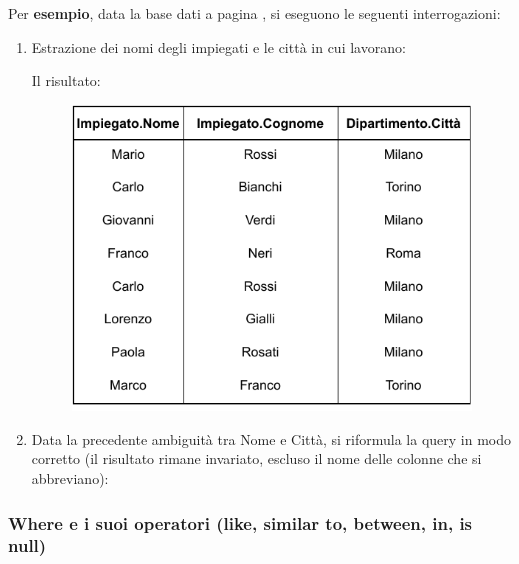 \documentclass[a4paper]{article}
\begin{document}
	\noindent
	Per \textcolor{Green4}{\textbf{esempio}}, data la base dati a pagina \pageref{select dbms}, si eseguono le seguenti interrogazioni:
	\begin{enumerate}
		\item Estrazione dei nomi degli impiegati e le città in cui lavorano:
		
		Il risultato:
		\begin{figure}[!htp]
			\centering
			\includegraphics[width=.7\textwidth]{img/from-ex1.pdf}
		\end{figure}
		
		\item Data la precedente ambiguità tra \textsf{Nome} e \textsf{Città}, si riformula la query in modo corretto (il risultato rimane invariato, escluso il nome delle colonne che si abbreviano):
		
	\end{enumerate}\newpage

	\subsubsection{\textsf{Where} e i suoi operatori (\textsf{like}, \textsf{similar to}, \textsf{between}, \textsf{in}, \textsf{is null})}
	
\end{document}
